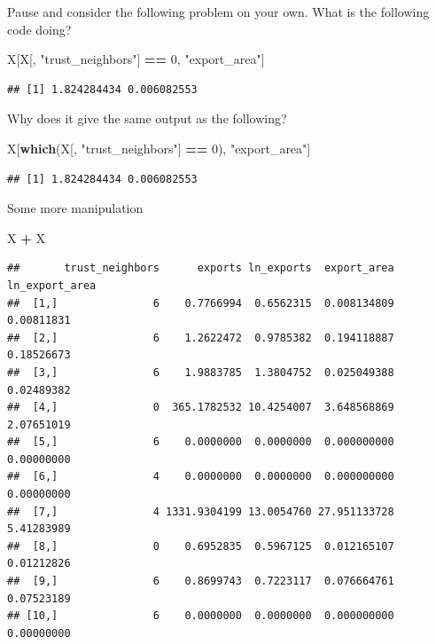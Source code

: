 \documentclass[]{book}
\newenvironment{Shaded}{\begin{snugshade}}{\end{snugshade}}
\newcommand{\KeywordTok}[1]{\textcolor[rgb]{0.13,0.29,0.53}{\textbf{#1}}}
\newcommand{\DecValTok}[1]{\textcolor[rgb]{0.00,0.00,0.81}{#1}}
\newcommand{\StringTok}[1]{\textcolor[rgb]{0.31,0.60,0.02}{#1}}
\newcommand{\OperatorTok}[1]{\textcolor[rgb]{0.81,0.36,0.00}{\textbf{#1}}}
\newcommand{\NormalTok}[1]{#1}
\theoremstyle{definition}
\theoremstyle{definition}
\theoremstyle{definition}
\theoremstyle{remark}
\begin{document}
Pause and consider the following problem on your own. What is the
following code doing?

\begin{Shaded}
\begin{Highlighting}[]
\NormalTok{X[X[, }\StringTok{"trust_neighbors"}\NormalTok{] }\OperatorTok{==}\StringTok{ }\DecValTok{0}\NormalTok{, }\StringTok{"export_area"}\NormalTok{]}
\end{Highlighting}
\end{Shaded}

\begin{verbatim}
## [1] 1.824284434 0.006082553
\end{verbatim}

Why does it give the same output as the following?

\begin{Shaded}
\begin{Highlighting}[]
\NormalTok{X[}\KeywordTok{which}\NormalTok{(X[, }\StringTok{"trust_neighbors"}\NormalTok{] }\OperatorTok{==}\StringTok{ }\DecValTok{0}\NormalTok{), }\StringTok{"export_area"}\NormalTok{]}
\end{Highlighting}
\end{Shaded}

\begin{verbatim}
## [1] 1.824284434 0.006082553
\end{verbatim}

Some more manipulation

\begin{Shaded}
\begin{Highlighting}[]
\NormalTok{X }\OperatorTok{+}\StringTok{ }\NormalTok{X}
\end{Highlighting}
\end{Shaded}

\begin{verbatim}
##       trust_neighbors      exports ln_exports  export_area ln_export_area
##  [1,]               6    0.7766994  0.6562315  0.008134809     0.00811831
##  [2,]               6    1.2622472  0.9785382  0.194118887     0.18526673
##  [3,]               6    1.9883785  1.3804752  0.025049388     0.02489382
##  [4,]               0  365.1782532 10.4254007  3.648568869     2.07651019
##  [5,]               6    0.0000000  0.0000000  0.000000000     0.00000000
##  [6,]               4    0.0000000  0.0000000  0.000000000     0.00000000
##  [7,]               4 1331.9304199 13.0054760 27.951133728     5.41283989
##  [8,]               0    0.6952835  0.5967125  0.012165107     0.01212826
##  [9,]               6    0.8699743  0.7223117  0.076664761     0.07523189
## [10,]               6    0.0000000  0.0000000  0.000000000     0.00000000
\end{verbatim}
\end{document}
